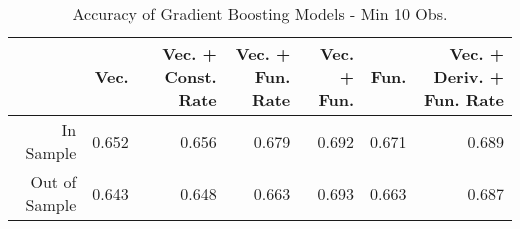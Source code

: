 \begin{table}[ht]
\centering
\begin{tabular}{rrrrrrr}
  \hline
 & Vec. & Vec. + Const. Rate & Vec. + Fun. Rate & Vec. + Fun. & Fun. & Vec. + Deriv. + Fun. Rate \\ 
  \hline
In Sample & 0.652 & 0.656 & 0.679 & 0.692 & 0.671 & 0.689 \\ 
  Out of Sample & 0.643 & 0.648 & 0.663 & 0.693 & 0.663 & 0.687 \\ 
   \hline
\end{tabular}
\caption{Accuracy of Gradient Boosting Models - Min 10 Obs.} 
\label{gbm_10obs_acc}
\end{table}
